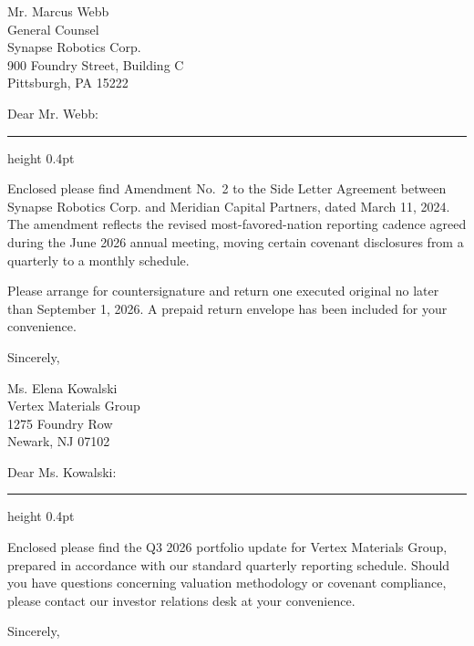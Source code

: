\documentclass[11pt]{letter}
\begin{document}
\begin{letter}{Mr. Marcus Webb\\
  General Counsel\\
  Synapse Robotics Corp.\\
  900 Foundry Street, Building C\\
  Pittsburgh, PA 15222}

\opening{Dear Mr. Webb:}
\vspace{-0.4\baselineskip}
{\color{hairline}\hrule height 0.4pt}
\vspace{0.6\baselineskip}

Enclosed please find Amendment No.\ 2 to the Side Letter Agreement between Synapse Robotics Corp. and Meridian Capital Partners, dated March 11, 2024. The amendment reflects the revised most-favored-nation reporting cadence agreed during the June 2026 annual meeting, moving certain covenant disclosures from a quarterly to a monthly schedule.

Please arrange for countersignature and return one executed original no later than September 1, 2026. A prepaid return envelope has been included for your convenience.

\closing{Sincerely,}
\end{letter}


\begin{letter}{Ms. Elena Kowalski\\
  Vertex Materials Group\\
  1275 Foundry Row\\
  Newark, NJ 07102}

\opening{Dear Ms. Kowalski:}
\vspace{-0.4\baselineskip}
{\color{hairline}\hrule height 0.4pt}
\vspace{0.6\baselineskip}

Enclosed please find the Q3 2026 portfolio update for Vertex Materials Group, prepared in accordance with our standard quarterly reporting schedule. Should you have questions concerning valuation methodology or covenant compliance, please contact our investor relations desk at your convenience.

\closing{Sincerely,}
\end{letter}
\end{document}
